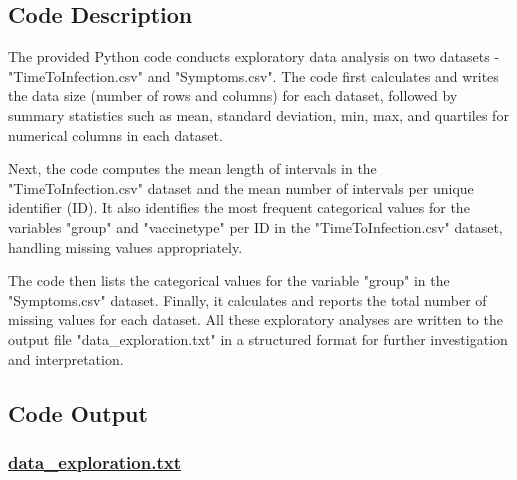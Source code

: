 \documentclass[11pt]{article}
\begin{document}
\subsection{Code Description}

The provided Python code conducts exploratory data analysis on two datasets - "TimeToInfection.csv" and "Symptoms.csv". 
The code first calculates and writes the data size (number of rows and columns) for each dataset, followed by summary statistics such as mean, standard deviation, min, max, and quartiles for numerical columns in each dataset.

Next, the code computes the mean length of intervals in the "TimeToInfection.csv" dataset and the mean number of intervals per unique identifier (ID). It also identifies the most frequent categorical values for the variables "group" and "vaccinetype" per ID in the "TimeToInfection.csv" dataset, handling missing values appropriately.

The code then lists the categorical values for the variable "group" in the "Symptoms.csv" dataset. Finally, it calculates and reports the total number of missing values for each dataset. All these exploratory analyses are written to the output file "data\_exploration.txt" in a structured format for further investigation and interpretation.

\subsection{Code Output}\hypertarget{file-data-exploration-txt}{}

\subsubsection*{\hyperlink{code-Data Exploration-data-exploration-txt}{data\_exploration.txt}}
\end{document}
